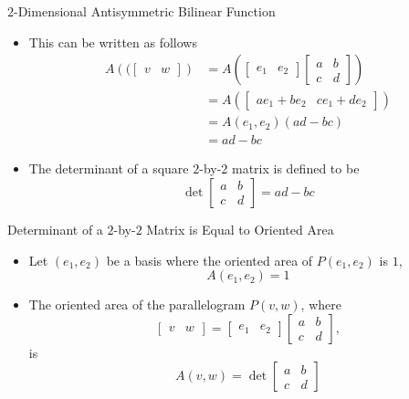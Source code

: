 \documentclass[usenames,dvipsnames,10pt]{beamer}
\begin{document}
\begin{frame}
  {$2$-Dimensional Antisymmetric Bilinear Function}

  \begin{itemize}
  \item This can be written as follows
    \begin{align*}
      A\left((\begin{bmatrix} v & w\end{bmatrix}\right)
      &= A\left(\begin{bmatrix} e_1 & e_2 \end{bmatrix}\begin{bmatrix} a & b \\ c & d \end{bmatrix}\right)\\
                                &= A\left(\begin{bmatrix} ae_1 + be_2  & ce_1 + de_2\end{bmatrix}\right)\\
                                &= A(e_1,e_2)(ad-bc)\\
                                &= ad-bc
    \end{align*}
  \item The determinant of a square $2$-by-$2$ matrix is defined to be
    \[
      \det \begin{bmatrix} a & b \\ c & d \end{bmatrix} = ad-bc
    \]
  \end{itemize}
\end{frame}

\begin{frame}
  {Determinant of a $2$-by-$2$ Matrix is Equal to Oriented Area}

  \begin{itemize}
  \item Let $(e_1,e_2)$ be a basis where the oriented area of $P(e_1,e_2)$ is $1$,
    \[ A(e_1,e_2) = 1 \]
  \item The oriented area of the parallelogram $P(v,w)$, where
    \[
      \begin{bmatrix} v & w \end{bmatrix} = \begin{bmatrix} e_1 & e_2 \end{bmatrix}
      \begin{bmatrix} a & b \\ c & d \end{bmatrix},
    \]
    is
    \[
      A(v,w) = \det \begin{bmatrix} a & b \\ c & d \end{bmatrix}
    \]
  \end{itemize}
\end{frame}
\end{document}
